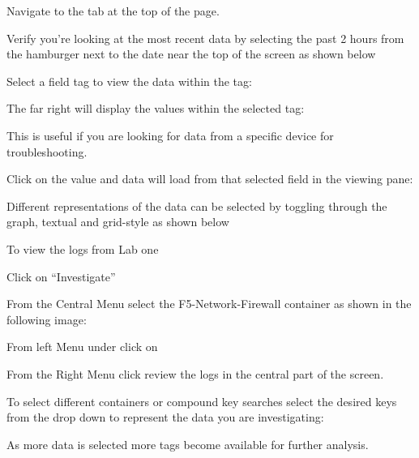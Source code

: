 \documentclass[letterpaper,10pt,english]{sphinxmanual}
\begin{document}
Navigate to the  tab at the top of the page.

Verify you’re looking at the most recent data by selecting the past 2
hours from the hamburger next to the date near the top of the screen as
shown below


Select a field tag to view the data within the tag:


The far right will display the values within the selected tag:


This is useful if you are looking for data from a specific device for
troubleshooting.

Click on the value and data will load from that selected field in the
viewing pane:

Different representations of the data can be selected by toggling
through the graph, textual and grid-style as shown below




To view the logs from Lab one

Click on “Investigate”

From the Central Menu select the F5-Network-Firewall container as shown
in the following image:


From left Menu under  click on 

From the Right Menu click review the logs in the central part of the
screen.

To select different containers or compound key searches select the
desired keys from the drop down to represent the data you are
investigating:


As more data is selected more tags become available for further
analysis.
\end{document}
